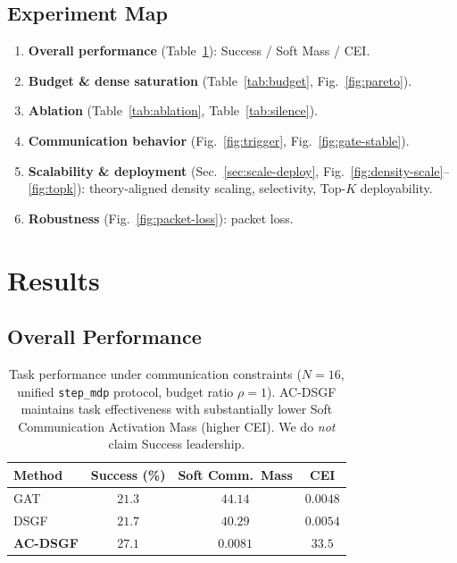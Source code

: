 \subsection{Experiment Map}
\begin{enumerate}
  \item \textbf{Overall performance} (Table~\ref{tab:main}): Success / Soft Mass / CEI.
  \item \textbf{Budget \& dense saturation} (Table~\ref{tab:budget}, Fig.~\ref{fig:pareto}).
  \item \textbf{Ablation} (Table~\ref{tab:ablation}, Table~\ref{tab:silence}).
  \item \textbf{Communication behavior} (Fig.~\ref{fig:trigger}, Fig.~\ref{fig:gate-stable}).
  \item \textbf{Scalability \& deployment} (Sec.~\ref{sec:scale-deploy}, Fig.~\ref{fig:density-scale}--\ref{fig:topk}):
        theory-aligned density scaling, selectivity, Top-$K$ deployability.
  \item \textbf{Robustness} (Fig.~\ref{fig:packet-loss}): packet loss.
\end{enumerate}


\section{Results}
\label{sec:results}

\subsection{Overall Performance}
\label{sec:main}

\begin{table}[t]
\centering
\caption{Task performance under communication constraints ($N{=}16$,
unified \texttt{step\_mdp} protocol, budget ratio $\rho{=}1$).
AC-DSGF maintains task effectiveness with substantially lower Soft
Communication Activation Mass (higher CEI).
We do \emph{not} claim Success leadership.}
\label{tab:main}
\begin{tabular}{lccc}
\toprule
Method & Success (\%) & Soft Comm.\ Mass & CEI \\
\midrule
GAT          & $21.3$ & $44.14$ & $0.0048$ \\
DSGF         & $21.7$ & $40.29$ & $0.0054$ \\
\textbf{AC-DSGF} & $27.1$ & $\mathbf{0.0081}$ & $\mathbf{33.5}$ \\
\bottomrule
\end{tabular}
\end{table}

